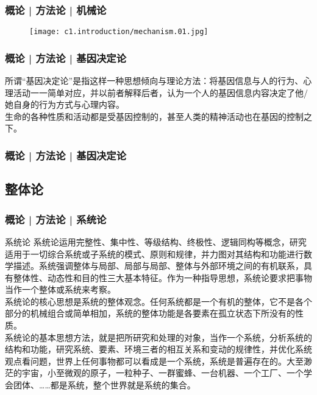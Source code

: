 \begin{frame}
  \frametitle{概论 | 方法论 | 机械论}
  \begin{figure}
    \centering
    \texttt{[image: c1.introduction/mechanism.01.jpg]}
  \end{figure}
\end{frame}

\begin{frame}
  \frametitle{概论 | 方法论 | 基因决定论}
所谓“基因决定论”是指这样一种思想倾向与理论方法：将基因信息与人的行为、心理活动一一简单对应，并以前者解释后者，认为一个人的基因信息内容决定了他/她自身的行为方式与心理内容。\\
\vspace{1em}
  生命的各种性质和活动都是受基因控制的，甚至人类的精神活动也在基因的控制之下。
\end{frame}

\begin{frame}
  \frametitle{概论 | 方法论 | 基因决定论}
  \begin{figure}
    \centering
    \qquad
  \end{figure}
\end{frame}

\subsection{整体论}
\begin{frame}
  \frametitle{概论 | 方法论 | 系统论}
  \begin{block}{系统论}
系统论运用完整性、集中性、等级结构、终极性、逻辑同构等概念，研究适用于一切综合系统或子系统的模式、原则和规律，并力图对其结构和功能进行数学描述。系统强调整体与局部、局部与局部、整体与外部环境之间的有机联系，具有整体性、动态性和目的性三大基本特征。作为一种指导思想，系统论要求把事物当作一个整体或系统来考察。\\
\vspace{1em}
系统论的核心思想是系统的整体观念。任何系统都是一个有机的整体，它不是各个部分的机械组合或简单相加，系统的整体功能是各要素在孤立状态下所没有的性质。\\
\vspace{1em}
系统论的基本思想方法，就是把所研究和处理的对象，当作一个系统，分析系统的结构和功能，研究系统、要素、环境三者的相互关系和变动的规律性，并优化系统观点看问题，世界上任何事物都可以看成是一个系统，系统是普遍存在的。大至渺茫的宇宙，小至微观的原子，一粒种子、一群蜜蜂、一台机器、一个工厂、一个学会团体、……都是系统，整个世界就是系统的集合。
  \end{block}
\end{frame}

